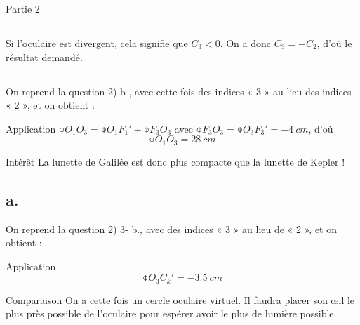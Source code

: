 \documentclass[../main/main.tex]{subfiles}
\begin{document}
\begin{center}
    \huge Partie 2
\end{center}

\subsection{}
Si l'oculaire est divergent, cela signifie que $C_3 < 0$. On a donc $C_3 = -
C_2$, d'où le résultat demandé.

\subsection{}
On reprend la question 2) b-, avec cette fois des indices « 3 » au lieu des
indices « 2 », et on obtient :

\begin{tcbraster}[raster columns=2, raster equal height=rows]
    \begin{NCexem}{Application}
        $\obar{O_1O_3} = \obar{O_1F_1'} + \obar{F_3O_3}$ avec $\obar{F_3O_3} =
        \obar{O_3F_3'} = \SI{-4}{cm}$, d'où
        \[ \boxed{\obar{O_1O_3} = \SI{+28}{cm}} \]
    \end{NCexem}
    \begin{inte}{Intérêt}
        La lunette de Galilée est donc plus compacte que la lunette de Kepler !
    \end{inte}
\end{tcbraster}
\vfill
\subsection{}

\begin{center}
    
\end{center}

\subsection{a.}
On reprend la question 2) 3- b., avec des indices « 3 » au lieu de « 2 », et on
obtient :
\begin{tcbraster}[raster columns=3, raster equal height=rows]
    \begin{NCexem}[raster multicolumn=1]{Application}
        \[ \boxed{\obar{O_3C_k'} = \SI{-3.5}{cm}}\]
    \end{NCexem}
    \begin{NCrema}[raster multicolumn=2]{Comparaison}
        On a cette fois un cercle oculaire virtuel. Il faudra placer son œil le plus
        près possible de l'oculaire pour espérer avoir le plus de lumière possible.
    \end{NCrema}
\end{tcbraster}
\end{document}
